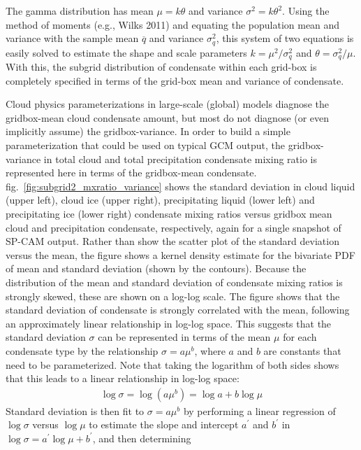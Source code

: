 The gamma distribution has mean \(\mu = k\theta\) and variance
\(\sigma^2 = k \theta^2\). Using the method of moments (e.g., Wilks
2011) and equating the population mean and variance with the sample mean
\(\overline{q}\) and variance \(\sigma_q^2\), this system of two
equations is easily solved to estimate the shape and scale parameters
\(k = \mu^2 / \sigma_q^2\) and \(\theta = \sigma_q^2 / \mu\). With this,
the subgrid distribution of condensate within each grid-box is
completely specified in terms of the grid-box mean and variance of
condensate.

Cloud physics parameterizations in large-scale (global) models diagnose
the gridbox-mean cloud condensate amount, but most do not diagnose (or
even implicitly assume) the gridbox-variance. In order to build a simple
parameterization that could be used on typical GCM output, the
gridbox-variance in total cloud and total precipitation condensate
mixing ratio is represented here in terms of the gridbox-mean
condensate. fig.~\ref{fig:subgrid2_mxratio_variance} shows the standard
deviation in cloud liquid (upper left), cloud ice (upper right),
precipitating liquid (lower left) and precipitating ice (lower right)
condensate mixing ratios versus gridbox mean cloud and precipitation
condensate, respectively, again for a single snapshot of SP-CAM output.
Rather than show the scatter plot of the standard deviation versus the
mean, the figure shows a kernel density estimate for the bivariate PDF
of mean and standard deviation (shown by the contours). Because the
distribution of the mean and standard deviation of condensate mixing
ratios is strongly skewed, these are shown on a log-log scale. The
figure shows that the standard deviation of condensate is strongly
correlated with the mean, following an approximately linear relationship
in log-log space. This suggests that the standard deviation \(\sigma\)
can be represented in terms of the mean \(\mu\) for each condensate type
by the relationship \(\sigma = a \mu^b\), where \(a\) and \(b\) are
constants that need to be parameterized. Note that taking the logarithm
of both sides shows that this leads to a linear relationship in log-log
space: \[\begin{gathered}
    \log \sigma = \log(a \mu^b) = \log a + b\log \mu\end{gathered}\]
Standard deviation is then fit to \(\sigma = a \mu^b\) by performing a
linear regression of \(\log\sigma\) versus \(\log \mu\) to estimate the
slope and intercept \(a^{\prime}\) and \(b^{\prime}\) in
\(\log \sigma = a^{\prime} \log \mu + b^{\prime}\), and then determining
